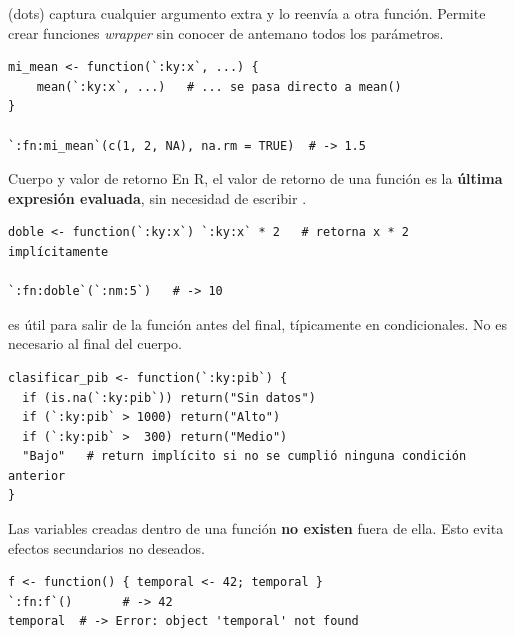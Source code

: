 \documentclass[8pt]{beamer}
\begin{document}
	
	
	
	\begin{frame}[fragile]
		 (dots) captura cualquier argumento extra y lo reenvía a otra función. Permite crear funciones \textit{wrapper} sin conocer de antemano todos los parámetros.
\begin{lstlisting}[style=RScript]
mi_mean <- function(`:ky:x`, ...) {
	mean(`:ky:x`, ...)   # ... se pasa directo a mean()
}

`:fn:mi_mean`(c(1, 2, NA), na.rm = TRUE)  # -> 1.5
\end{lstlisting}
	\end{frame}


	\begin{frame}[fragile]{Cuerpo y valor de retorno}
		En R, el valor de retorno de una función es la \textbf{última expresión evaluada}, sin necesidad de escribir .
\begin{lstlisting}[style=RScript]
doble <- function(`:ky:x`) `:ky:x` * 2   # retorna x * 2 implícitamente

`:fn:doble`(`:nm:5`)   # -> 10
\end{lstlisting}

		 es útil para salir de la función antes del final, típicamente en condicionales. No es necesario al final del cuerpo.
\begin{lstlisting}[style=RScript]
clasificar_pib <- function(`:ky:pib`) {
  if (is.na(`:ky:pib`)) return("Sin datos")
  if (`:ky:pib` > 1000) return("Alto")
  if (`:ky:pib` >  300) return("Medio")
  "Bajo"   # return implícito si no se cumplió ninguna condición anterior
}
\end{lstlisting}
	\end{frame}
	
	
	
\begin{frame}[fragile]
Las variables creadas dentro de una función \textbf{no existen} fuera de ella. Esto evita efectos secundarios no deseados.
\begin{lstlisting}[style=RScript]
f <- function() { temporal <- 42; temporal }
`:fn:f`()       # -> 42
temporal  # -> Error: object 'temporal' not found
\end{lstlisting}
\end{frame}
	
\end{document}
